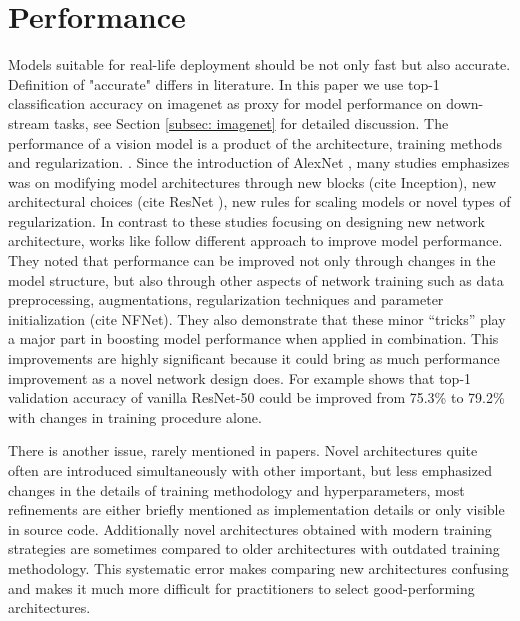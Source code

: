 
\chapter{Performance} \label{sec: performance}

Models suitable for real-life deployment should be not only fast but also accurate. Definition of "accurate" differs in literature. In this paper we use top-1 classification accuracy on imagenet as proxy for model performance on down-stream tasks, see Section \ref{subsec: imagenet} for detailed discussion. 
The performance of a vision model is a product of the architecture, training methods and regularization. \cite{lee2020_compounding_improvements}. 
Since the introduction of AlexNet \cite{krizhevsky2012_imagenet_alexnet}, many studies emphasizes was on modifying model architectures through new blocks (cite Inception), new architectural choices (cite ResNet ), new rules for scaling models \cite{tan2019_efficientnet} or novel types of regularization. \cite{zhang2017_mixup} \cite{yun2019_cutmix}
In contrast to these studies focusing on designing new network architecture, works like \cite{he2019_bag_of_tricks} follow different approach to improve model performance. They noted that performance can be improved not only through changes in the model structure, but also through other aspects of network training such as data preprocessing, augmentations, regularization techniques and parameter initialization (cite NFNet). They also demonstrate that these minor “tricks” play a major part in boosting model performance when applied in combination. This improvements are highly significant because it could bring as much performance improvement as a novel network design does. For example \cite{he2019_bag_of_tricks} shows that top-1 validation accuracy of vanilla ResNet-50 could be improved from 75.3\% to 79.2\% with changes in training procedure alone. 


There is another issue, rarely mentioned in papers. Novel architectures quite often are introduced simultaneously with other important, but less emphasized changes in the details of training methodology and hyperparameters, most refinements are either briefly mentioned as implementation details or only visible in source code. Additionally novel architectures obtained with modern training strategies are sometimes compared to older architectures with outdated training methodology. This systematic error makes comparing new architectures confusing and makes it much more difficult for practitioners to select good-performing architectures. 

